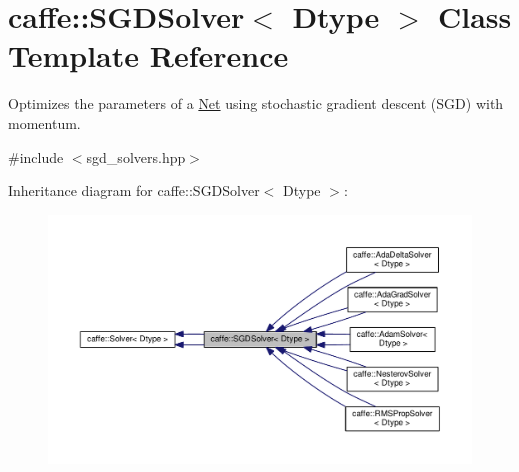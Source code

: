 \hypertarget{classcaffe_1_1_s_g_d_solver}{}\section{caffe\+:\+:S\+G\+D\+Solver$<$ Dtype $>$ Class Template Reference}
\label{classcaffe_1_1_s_g_d_solver}


Optimizes the parameters of a \mbox{\hyperlink{classcaffe_1_1_net}{Net}} using stochastic gradient descent (S\+GD) with momentum.  




{\ttfamily \#include $<$sgd\+\_\+solvers.\+hpp$>$}



Inheritance diagram for caffe\+:\+:S\+G\+D\+Solver$<$ Dtype $>$\+:
\nopagebreak
\begin{figure}[H]
\begin{center}
\leavevmode
\includegraphics[width=350pt]{classcaffe_1_1_s_g_d_solver__inherit__graph}
\end{center}
\end{figure}
